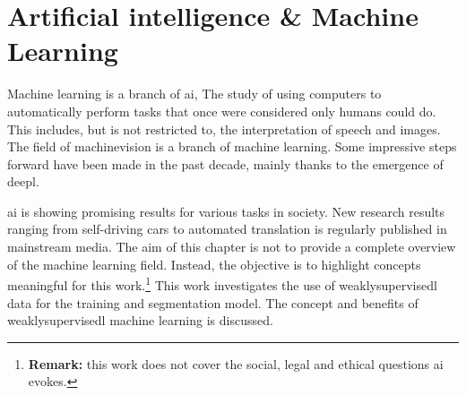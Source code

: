 \chapter{Artificial intelligence \& Machine Learning\label{sec:ai_and_ml}}
\par{
    Machine learning is a branch of \Gls{ai}, The study of using computers to automatically perform tasks that once were considered only humans could do. This includes, but is not restricted to, the interpretation of speech and images. 
    The field of \Gls{machinevision} is a branch of machine learning.
    Some impressive steps forward have been made in the past decade, mainly thanks to the emergence of \Gls{deepl}.
}
\par{
    \Gls{ai} is showing promising results for various tasks in society.
    New research results ranging from self-driving cars to automated translation is regularly published in mainstream media.
    The aim of this chapter is not to provide a complete overview of the machine learning field.
    Instead, the objective is to highlight concepts meaningful for this work.\footnote{
        \textbf{Remark:} this work does not cover the social, legal and ethical questions \Gls{ai} evokes.
    }
    This work investigates the use of \Gls{weaklysupervisedl} data for the training and segmentation model. 
    The concept and benefits of \Gls{weaklysupervisedl} machine learning is discussed.
}

